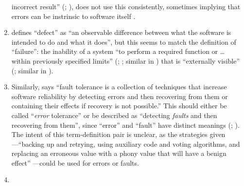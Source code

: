 \begin{enumerate}
          incorrect result'' (\citealp[pp.~12\=/3]{SWEBOK2024};
          \citealp[p.~399]{vanVliet2000}), \citeauthor{SWEBOK2024} does not
          use this consistently, sometimes implying that errors can be instrinsic
          to software itself \citeyearpar[pp.~4\=/9, 6\=/5, 7\=/3, 12\=/4,
              12\=/9, 12\=/13]{SWEBOK2024}.
    \item %
           \citet[p.~1\=/1]{SWEBOK2024} defines ``defect'' as ``an
          observable difference between what the software is intended to do and
          what it does'', but this seems to match the definition of
          ``failure'': the inability of a system ``to perform a required
          function or \dots{} within previously specified limits''
          (\citealp[p.~7]{IEEE2019a}; \citeyear[p.~139]{IEEE2010}%
          ; similar in \citealp[p.~400]{vanVliet2000})
          that is ``externally visible'' (\citealp[p.~7]{IEEE2019a}; similar in
          \citealp[p.~400]{vanVliet2000}).
    \item %
          Similarly, \citet[p.~4\=/11]{SWEBOK2024} says ``fault tolerance is
          a collection of techniques that increase software reliability by
          detecting errors and then recovering from them or containing their
          effects if recovery is not possible.'' This should either be called
          ``\emph{error} tolerance'' or be described as ``detecting
          \emph{faults} and then recovering from them'', since ``error'' and
          ``fault'' have distinct meanings (\citealp[p.~5\=/3]{SWEBOK2024};
          \citealp[pp.~399\==400]{vanVliet2000}). The intent of this
          term-definition pair is unclear, as the strategies given---``backing
          up and retrying, using auxiliary code and voting algorithms, and
          replacing an erroneous value with a phony value that will have a
          benign effect'' \citep[p.~4\=/11]{SWEBOK2024}---could be used for
          errors or faults.
    \item %

\end{enumerate}
